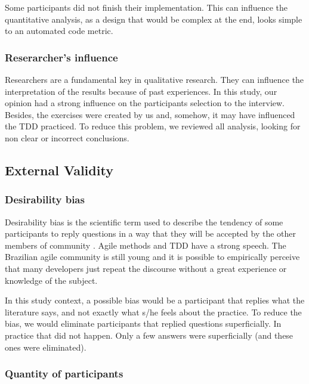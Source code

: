 \documentclass[times]{speauth}
\begin{document}
Some participants did not finish their implementation. This can influence the
quantitative analysis, as a design that would be complex at the end, looks simple
to an automated code metric.

\subsubsection{Reserarcher's influence}

Researchers are a fundamental key in qualitative research. They can influence
the interpretation of the results because of past experiences.
In this study, our opinion had a strong influence on the participants selection
to the interview.
Besides, the exercises were created by us and, somehow, it may have influenced
the TDD practiced. To reduce this problem, we reviewed all analysis, looking for
non clear or incorrect conclusions.


\subsection{External Validity}

\subsubsection{Desirability bias}

Desirability bias is the scientific term used to describe the tendency of some participants
to reply questions in a way that they will be accepted by the other members
of community \cite{crowne}.
Agile methods and TDD have a strong speech. The Brazilian agile community is still
young and it is possible to empirically perceive that many developers just
repeat the discourse without a great experience or knowledge of the subject.

In this study context, a possible bias would be a participant that replies
what the literature says, and not exactly what s/he feels about the practice.
To reduce the bias, we would eliminate participants that replied questions superficially.
In practice that did not happen. Only a few answers were superficially (and these
ones were eliminated).

\subsubsection{Quantity of participants}
\end{document}
